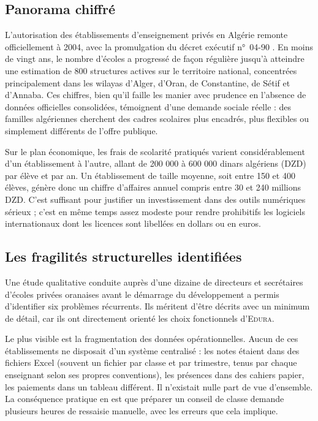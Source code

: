\documentclass[12pt,a4paper,oneside]{report}
\newcommand{\edura}{\textsc{Edura}}
\begin{document}
\subsection{Panorama chiffré}

L'autorisation des établissements d'enseignement privés en Algérie remonte officiellement à 2004, avec la promulgation du décret exécutif n°~04-90 \autocite{decret2004}. En moins de vingt ans, le nombre d'écoles a progressé de façon régulière jusqu'à atteindre une estimation de 800 structures actives sur le territoire national, concentrées principalement dans les wilayas d'Alger, d'Oran, de Constantine, de Sétif et d'Annaba. Ces chiffres, bien qu'il faille les manier avec prudence en l'absence de données officielles consolidées, témoignent d'une demande sociale réelle : des familles algériennes cherchent des cadres scolaires plus encadrés, plus flexibles ou simplement différents de l'offre publique.

Sur le plan économique, les frais de scolarité pratiqués varient considérablement d'un établissement à l'autre, allant de 200 000 à 600 000 dinars algériens (\ac{DZD}) par élève et par an. Un établissement de taille moyenne, soit entre 150 et 400 élèves, génère donc un chiffre d'affaires annuel compris entre 30 et 240 millions \ac{DZD}. C'est suffisant pour justifier un investissement dans des outils numériques sérieux ; c'est en même temps assez modeste pour rendre prohibitifs les logiciels internationaux dont les licences sont libellées en dollars ou en euros.

\subsection{Les fragilités structurelles identifiées}

Une étude qualitative conduite auprès d'une dizaine de directeurs et secrétaires d'écoles privées oranaises avant le démarrage du développement a permis d'identifier six problèmes récurrents. Ils méritent d'être décrits avec un minimum de détail, car ils ont directement orienté les choix fonctionnels d'\edura{}.

Le plus visible est la fragmentation des données opérationnelles. Aucun de ces établissements ne disposait d'un système centralisé : les notes étaient dans des fichiers Excel (souvent un fichier par classe et par trimestre, tenus par chaque enseignant selon ses propres conventions), les présences dans des cahiers papier, les paiements dans un tableau différent. Il n'existait nulle part de vue d'ensemble. La conséquence pratique en est que préparer un conseil de classe demande plusieurs heures de ressaisie manuelle, avec les erreurs que cela implique.
\end{document}
